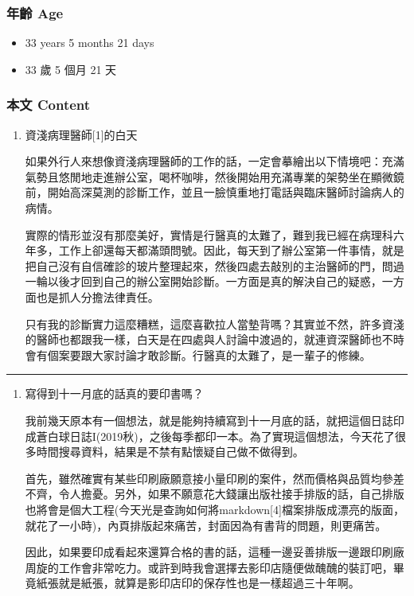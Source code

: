 \documentclass[
]{article}
\providecommand{\tightlist}{%
  \setlength{\itemsep}{0pt}\setlength{\parskip}{0pt}}
\begin{document}
\hypertarget{ux5e74ux9f61-age-15}{%
\subsubsection{年齡 Age}\label{ux5e74ux9f61-age-15}}

\begin{itemize}
\tightlist
\item
  33 years 5 months 21 days
\item
  33 歲 5 個月 21 天
\end{itemize}

\hypertarget{ux672cux6587-content-15}{%
\subsubsection{本文 Content}\label{ux672cux6587-content-15}}

\begin{enumerate}
\def\labelenumi{\arabic{enumi}.}
\item
  資淺病理醫師{[}1{]}的白天

  如果外行人來想像資淺病理醫師的工作的話，一定會摹繪出以下情境吧：充滿氣勢且悠閒地走進辦公室，喝杯咖啡，然後開始用充滿專業的架勢坐在顯微鏡前，開始高深莫測的診斷工作，並且一臉慎重地打電話與臨床醫師討論病人的病情。

  實際的情形並沒有那麼美好，實情是行醫真的太難了，難到我已經在病理科六年多，工作上卻還每天都滿頭問號。因此，每天到了辦公室第一件事情，就是把自己沒有自信確診的玻片整理起來，然後四處去敲別的主治醫師的門，問過一輪以後才回到自己的辦公室開始診斷。一方面是真的解決自己的疑惑，一方面也是抓人分擔法律責任。

  只有我的診斷實力這麼糟糕，這麼喜歡拉人當墊背嗎？其實並不然，許多資淺的醫師也都跟我一樣，白天是在四處與人討論中渡過的，就連資深醫師也不時會有個案要跟大家討論才敢診斷。行醫真的太難了，是一輩子的修練。
\end{enumerate}

\begin{center}\rule{0.5\linewidth}{\linethickness}\end{center}

\begin{enumerate}
\def\labelenumi{\arabic{enumi}.}
\setcounter{enumi}{1}
\item
  寫得到十一月底的話真的要印書嗎？

  我前幾天原本有一個想法，就是能夠持續寫到十一月底的話，就把這個日誌印成蒼白球日誌I(2019秋)，之後每季都印一本。為了實現這個想法，今天花了很多時間搜尋資料，結果是不禁有點懷疑自己做不做得到。

  首先，雖然確實有某些印刷廠願意接小量印刷的案件，然而價格與品質均參差不齊，令人擔憂。另外，如果不願意花大錢讓出版社接手排版的話，自己排版也將會是個大工程(今天光是查詢如何將markdown{[}4{]}檔案排版成漂亮的版面，就花了一小時)，內頁排版起來痛苦，封面因為有書背的問題，則更痛苦。

  因此，如果要印成看起來還算合格的書的話，這種一邊妥善排版一邊跟印刷廠周旋的工作會非常吃力。或許到時我會選擇去影印店隨便做醜醜的裝訂吧，畢竟紙張就是紙張，就算是影印店印的保存性也是一樣超過三十年啊。
\end{enumerate}
\end{document}
